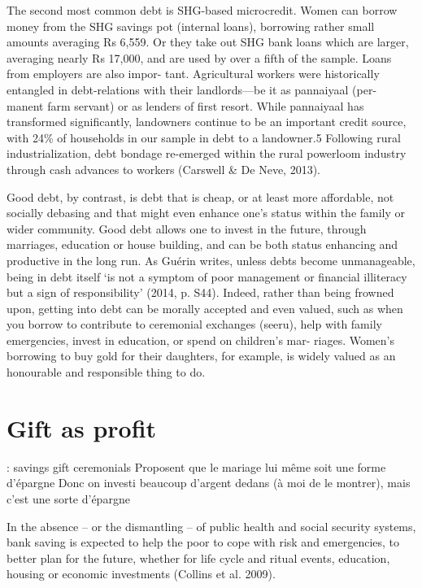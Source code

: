 \documentclass[a4paper, 11pt, onecolumn]{article}
\begin{document}
The second most common debt is SHG-based microcredit. Women can borrow money from the SHG savings
pot (internal loans), borrowing rather small amounts averaging Rs 6,559. Or they take out SHG bank loans which are
larger, averaging nearly Rs 17,000, and are used by over a fifth of the sample. Loans from employers are also impor-
tant. Agricultural workers were historically entangled in debt-relations with their landlords—be it as pannaiyaal (per-
manent farm servant) or as lenders of first resort. While pannaiyaal has transformed significantly, landowners
continue to be an important credit source, with 24\% of households in our sample in debt to a landowner.5 Following
rural industrialization, debt bondage re-emerged within the rural powerloom industry through cash advances to
workers (Carswell \& De Neve, 2013). 

Good debt, by contrast, is debt that is cheap, or at least more affordable, not socially debasing and that
might even enhance one's status within the family or wider community. Good debt allows one to invest in the
future, through marriages, education or house building, and can be both status enhancing and productive in the
long run. As Guérin writes, unless debts become unmanageable, being in debt itself ‘is not a symptom of poor
management or financial illiteracy but a sign of responsibility’ (2014, p. S44). Indeed, rather than being frowned
upon, getting into debt can be morally accepted and even valued, such as when you borrow to contribute to
ceremonial exchanges (seeru), help with family emergencies, invest in education, or spend on children's mar-
riages. Women's borrowing to buy gold for their daughters, for example, is widely valued as an honourable and
responsible thing to do.


\section{Gift as profit}


\cite{Guerin2020c} : savings gift ceremonials
Proposent que le mariage lui même soit une forme d'épargne
Donc on investi beaucoup d'argent dedans (à moi de le montrer), mais c'est une sorte d'épargne

In the absence – or the dismantling – of public health and social security systems, bank saving is
expected to help the poor to cope with risk and emergencies, to better plan for the future, whether for
life cycle and ritual events, education, housing or economic investments (Collins et al. 2009).
\end{document}

